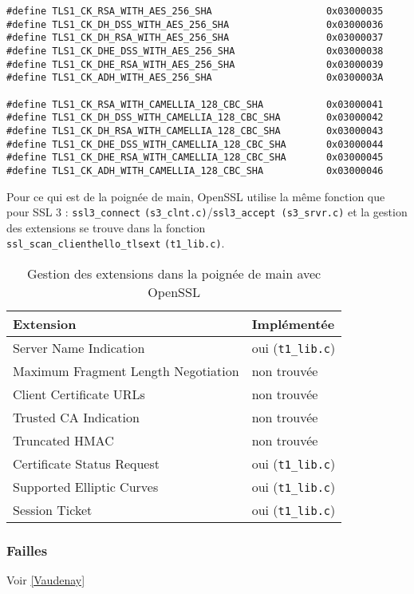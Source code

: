 \begin{lstlisting}[style=customc,caption=constantes protocole TLS, label=constantes-TLS]
#define TLS1_CK_RSA_WITH_AES_256_SHA                    0x03000035
#define TLS1_CK_DH_DSS_WITH_AES_256_SHA                 0x03000036
#define TLS1_CK_DH_RSA_WITH_AES_256_SHA                 0x03000037
#define TLS1_CK_DHE_DSS_WITH_AES_256_SHA                0x03000038
#define TLS1_CK_DHE_RSA_WITH_AES_256_SHA                0x03000039
#define TLS1_CK_ADH_WITH_AES_256_SHA                    0x0300003A

#define TLS1_CK_RSA_WITH_CAMELLIA_128_CBC_SHA           0x03000041
#define TLS1_CK_DH_DSS_WITH_CAMELLIA_128_CBC_SHA        0x03000042
#define TLS1_CK_DH_RSA_WITH_CAMELLIA_128_CBC_SHA        0x03000043
#define TLS1_CK_DHE_DSS_WITH_CAMELLIA_128_CBC_SHA       0x03000044
#define TLS1_CK_DHE_RSA_WITH_CAMELLIA_128_CBC_SHA       0x03000045
#define TLS1_CK_ADH_WITH_CAMELLIA_128_CBC_SHA           0x03000046
\end{lstlisting}

Pour ce qui est de la poignée de main, OpenSSL utilise la même fonction que pour SSL 3 : \verb+ssl3_connect+ \verb+(s3_clnt.c)+/\verb+ssl3_accept (s3_srvr.c)+ et la gestion des extensions se trouve dans la fonction\\ \verb+ssl_scan_clienthello_tlsext+ \verb+(t1_lib.c)+.

\begin{table}
\centering
\begin{tabularx}{16cm}{|X|l|}
\hline
\textbf{Extension}&\textbf{Implémentée}\\ \hline
Server Name Indication& oui (\verb+t1_lib.c+)\\ \hline
Maximum Fragment Length Negotiation& non trouvée\\ \hline
Client Certificate URLs& non trouvée\\ \hline
Trusted CA Indication& non trouvée\\ \hline
Truncated HMAC & non trouvée\\ \hline
Certificate Status Request& oui (\verb+t1_lib.c+)\\ \hline
Supported Elliptic Curves& oui (\verb+t1_lib.c+)\\ \hline
Session Ticket& oui (\verb+t1_lib.c+)\\ \hline
\end{tabularx}
\caption{Gestion des extensions dans la poignée de main avec OpenSSL}
\label{extensionsOpenssl}
\end{table}


\subsubsection{Failles}
\setcounter{subsubsubsection}{0}
Voir \ref{Vaudenay}

